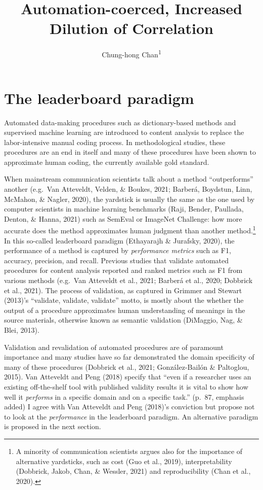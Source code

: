 \documentclass[english,man,floatsintext]{apa6}
\title{Automation-coerced, Increased Dilution of Correlation}
\author{Chung-hong Chan\textsuperscript{1}}
\date{}
\affiliation{\vspace{0.5cm}\textsuperscript{1} Mannheimer Zentrum für Europäische Sozialforschung, Universität Mannheim, Germany}
\begin{document}
\maketitle

\hypertarget{the-leaderboard-paradigm}{%
\section{The leaderboard paradigm}\label{the-leaderboard-paradigm}}

Automated data-making procedures such as dictionary-based methods and supervised machine learning are introduced to content analysis to replace the labor-intensive manual coding process. In methodological studies, these procedures are an end in itself and many of these procedures have been shown to approximate human coding, the currently available gold standard.

When mainstream communication scientists talk about a method \enquote{outperforms} another (e.g.~Van Atteveldt, Velden, \& Boukes, 2021; Barberá, Boydstun, Linn, McMahon, \& Nagler, 2020), the yardstick is usually the same as the one used by computer scientists in machine learning benchmarks (Raji, Bender, Paullada, Denton, \& Hanna, 2021) such as SemEval or ImageNet Challenge: how more accurate does the method approximates human judgment than another method.\footnote{A minority of communication scientists argues also for the importance of alternative yardsticks, such as cost (Guo et al., 2019), interpretability (Dobbrick, Jakob, Chan, \& Wessler, 2021) and reproducibility (Chan et al., 2020).} In this so-called leaderboard paradigm (Ethayarajh \& Jurafsky, 2020), the performance of a method is captured by \emph{performance metrics} such as F1, accuracy, precision, and recall. Previous studies that validate automated procedures for content analysis reported and ranked metrics such as F1 from various methods (e.g.~Van Atteveldt et al., 2021; Barberá et al., 2020; Dobbrick et al., 2021). The process of validation, as captured in Grimmer and Stewart (2013)'s \enquote{validate, validate, validate} motto, is mostly about the whether the output of a procedure approximates human understanding of meanings in the source materials, otherwise known as semantic validation (DiMaggio, Nag, \& Blei, 2013).

Validation and revalidation of automated procedures are of paramount importance and many studies have so far demonstrated the domain specificity of many of these procedures (Dobbrick et al., 2021; González-Bailón \& Paltoglou, 2015). Van Atteveldt and Peng (2018) specify that \enquote{even if a researcher uses an existing off-the-shelf tool with published validity results it is vital to show how well it \emph{performs} in a specific domain and on a specific task.} (p.~87, emphasis added) I agree with Van Atteveldt and Peng (2018)'s conviction but propose not to look at the \emph{performance} in the leaderboard paradigm. An alternative paradigm is proposed in the next section.
\end{document}
